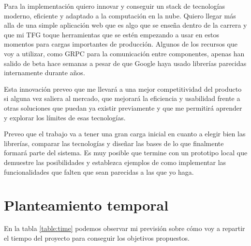 Para la implementación quiero innovar y conseguir un stack de tecnologías moderno, eficiente y adaptado a la computación en la nube. Quiero llegar más alla de una simple aplicación web que es algo que se enseña dentro de la carrera y que mi TFG toque herramientas que se estén empezando a usar en estos momentos para cargas importantes de producción. Algunos de los recursos que voy a utilizar, como GRPC para la comunicación entre componentes, apenas han salido de beta hace semanas a pesar de que Google haya usado librerías parecidas internamente durante años.

Esta innovación preveo que me llevará a una mejor competitividad del producto si alguna vez saliera al mercado, que mejorará la eficiencia y usabilidad frente a otras soluciones que puedan ya existir previamente y que me permitirá aprender y explorar los límites de esas tecnologías.

Preveo que el trabajo va a tener una gran carga inicial en cuanto a elegir bien las librerías, comparar las tecnologías y diseñar las bases de lo que finalmente formará parte del sistema. Es muy posible que termine con un prototipo local que demuestre las posibilidades y establezca ejemplos de como implementar las funcionalidades que falten que sean parecidas a las que yo haga.

\section{Planteamiento temporal}

En la tabla \ref{table:time} podemos observar mi previsión sobre cómo voy a repartir el tiempo del proyecto para conseguir los objetivos propuestos.

